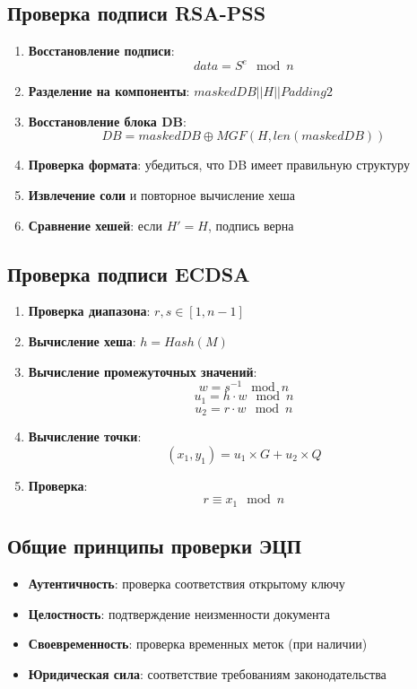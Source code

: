 \subsection*{Проверка подписи RSA-PSS}
\begin{enumerate}
    \item \textbf{Восстановление подписи}: 
    $$ data = S^{e} \mod n $$
    \item \textbf{Разделение на компоненты}: $maskedDB || H || Padding2$
    \item \textbf{Восстановление блока DB}: 
    $$ DB = maskedDB \oplus MGF(H, len(maskedDB)) $$
    \item \textbf{Проверка формата}: убедиться, что DB имеет правильную структуру
    \item \textbf{Извлечение соли} и повторное вычисление хеша
    \item \textbf{Сравнение хешей}: если $H' = H$, подпись верна
\end{enumerate}

\subsection*{Проверка подписи ECDSA}
\begin{enumerate}
    \item \textbf{Проверка диапазона}: $r, s \in [1, n-1]$
    \item \textbf{Вычисление хеша}: $h = Hash(M)$
    \item \textbf{Вычисление промежуточных значений}:
    $$ w = s^{-1} \mod n $$
    $$ u_1 = h \cdot w \mod n $$
    $$ u_2 = r \cdot w \mod n $$
    \item \textbf{Вычисление точки}:
    $$ (x_1, y_1) = u_1 \times G + u_2 \times Q $$
    \item \textbf{Проверка}: 
    $$ r \equiv x_1 \mod n $$
\end{enumerate}

\subsection*{Общие принципы проверки ЭЦП}
\begin{itemize}
    \item \textbf{Аутентичность}: проверка соответствия открытому ключу
    \item \textbf{Целостность}: подтверждение неизменности документа
    \item \textbf{Своевременность}: проверка временных меток (при наличии)
    \item \textbf{Юридическая сила}: соответствие требованиям законодательства
\end{itemize}
